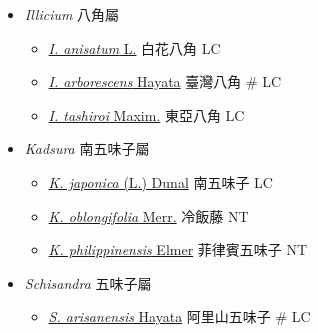 
  \begin{itemize}
 \item[] \textit{Illicium} 八角屬
                                
  \begin{itemize}
        \item[] \href{http://www.theplantlist.org/tpl1.1/search?q=Illicium+anisatum}{\textit{I. anisatum} L.}   白花八角   LC
        \item[] \href{http://www.theplantlist.org/tpl1.1/search?q=Illicium+arborescens}{\textit{I. arborescens} Hayata}   臺灣八角  \# LC
        \item[] \href{http://www.theplantlist.org/tpl1.1/search?q=Illicium+tashiroi}{\textit{I. tashiroi} Maxim.}   東亞八角   LC
  \end{itemize}
 \item[] \textit{Kadsura} 南五味子屬
                                
  \begin{itemize}
        \item[] \href{http://www.theplantlist.org/tpl1.1/search?q=Kadsura+japonica}{\textit{K. japonica} (L.) Dunal}   南五味子   LC
        \item[] \href{http://www.theplantlist.org/tpl1.1/search?q=Kadsura+oblongifolia}{\textit{K. oblongifolia} Merr.}   冷飯藤   NT
        \item[] \href{http://www.theplantlist.org/tpl1.1/search?q=Kadsura+philippinensis}{\textit{K. philippinensis} Elmer}   菲律賓五味子   NT
  \end{itemize}
 \item[] \textit{Schisandra} 五味子屬
                                
  \begin{itemize}
        \item[] \href{http://www.theplantlist.org/tpl1.1/search?q=Schisandra+arisanensis}{\textit{S. arisanensis} Hayata}   阿里山五味子  \# LC
  \end{itemize}
  \end{itemize}
